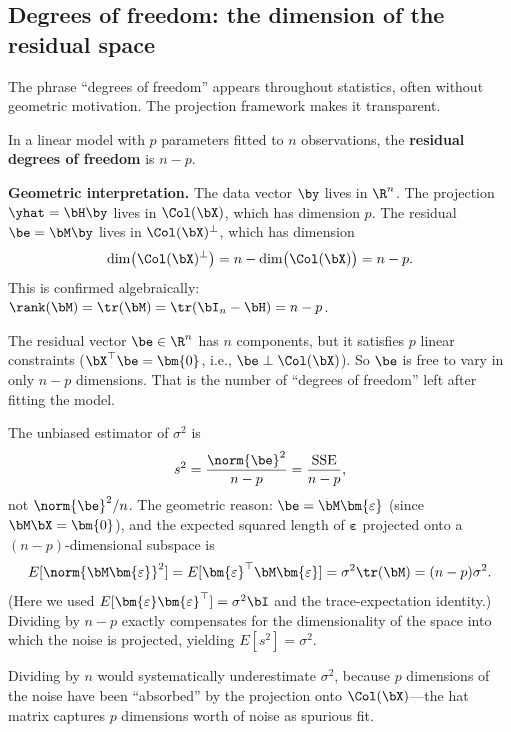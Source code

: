 \subsection{Degrees of freedom: the dimension of the residual space}\label{sec:df}

The phrase ``degrees of freedom'' appears throughout statistics, often without
geometric motivation.  The projection framework makes it transparent.

\begin{definition}
In a linear model with $p$ parameters fitted to $n$ observations, the
\textbf{residual degrees of freedom} is $n - p$.
\end{definition}

\noindent\textbf{Geometric interpretation.}
The data vector $\by$ lives in $\R^n$.
The projection $\yhat = \bH\by$ lives in $\Col(\bX)$, which has dimension $p$.
The residual $\be = \bM\by$ lives in $\Col(\bX)^\perp$, which has dimension
\[
  \dim\bigl(\Col(\bX)^\perp\bigr) = n - \dim\bigl(\Col(\bX)\bigr) = n - p.
\]
This is confirmed algebraically: $\rank(\bM) = \tr(\bM) = \tr(\bI_n - \bH) = n - p$.

The residual vector $\be\in\R^n$ has $n$ components, but it satisfies $p$
linear constraints ($\bX^\top\be = \bm{0}$, i.e., $\be\perp\Col(\bX)$).
So $\be$ is free to vary in only $n - p$ dimensions.
That is the number of ``degrees of freedom'' left after fitting the model.

\begin{remark}
The unbiased estimator of $\sigma^2$ is
\[
  s^2 = \frac{\norm{\be}^2}{n - p} = \frac{\text{SSE}}{n-p},
\]
not $\norm{\be}^2/n$.  The geometric reason: $\be = \bM\bm{\varepsilon}$
(since $\bM\bX = \bm{0}$), and the expected squared length of
$\bm{\varepsilon}$ projected onto a $(n-p)$-dimensional subspace is
\[
  E[\norm{\bM\bm{\varepsilon}}^2]
  = E[\bm{\varepsilon}^\top\bM\bm{\varepsilon}]
  = \sigma^2\tr(\bM)
  = (n-p)\sigma^2.
\]
(Here we used $E[\bm{\varepsilon}\bm{\varepsilon}^\top] = \sigma^2\bI$
and the trace-expectation identity.)
Dividing by $n-p$ exactly compensates for the dimensionality of the
space into which the noise is projected, yielding $E[s^2] = \sigma^2$.

Dividing by $n$ would systematically underestimate $\sigma^2$, because
$p$ dimensions of the noise have been ``absorbed'' by the projection
onto $\Col(\bX)$---the hat matrix captures $p$ dimensions worth of noise
as spurious fit.
\end{remark}

